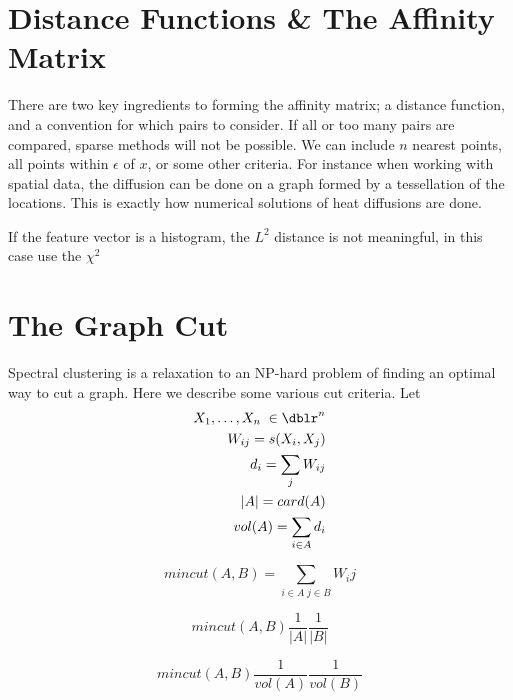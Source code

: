 \section*{Distance Functions \& The Affinity Matrix}

There are two key ingredients to forming the affinity matrix; a distance function, and a convention for which pairs to consider.  If all or too many pairs are compared, sparse methods will not be possible.  We can include $n$ nearest points, all points within $\epsilon$ of $x$, or some other criteria. For instance when working with spatial data, the diffusion can be done on a graph formed by a tessellation of the locations.  This is exactly how numerical solutions of heat diffusions are done.

If the feature vector is a histogram, the $L^2$ distance is not meaningful, in this case use the $\chi^2$

\section*{The Graph Cut}
Spectral clustering is a relaxation to an NP-hard problem of finding an optimal way to cut a graph. Here we describe some various cut criteria.  Let
\begin{eqnarray*}
X_1, \hdots , X_n \; \in \dblr^n  \\
W_{ij} = s(X_i,X_j) \\
d_i = \sum_{j} W_{i j}\\
|A| = card (A) \\
vol(A) = \sum_{i \in A} d_i
\end{eqnarray*}

\begin{defn}
\begin{equation*} min cut(A,B) =\sum_{i \in A \; j \in B}  W_ij \end{equation*}
\end{defn}

\begin{defn}
\begin{equation*} min cut (A,B) \frac{1}{|A|} \frac{1}{|B|} \end{equation*}
\end{defn}
\begin{defn}[n Cut ]
\begin{equation*} min cut (A,B) \frac{1}{vol(A)} \frac{1}{vol(B)} \end{equation*}
\end{defn}


